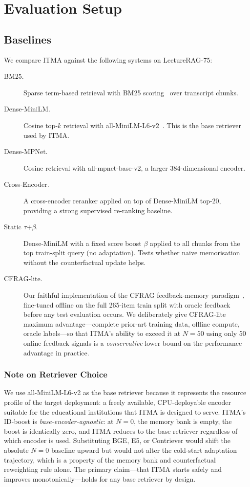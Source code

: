 \documentclass[journal]{IEEEtran}
\begin{document}
\section{Evaluation Setup}
\label{sec:eval}

\subsection{Baselines}
We compare ITMA against the following systems on LectureRAG-75:
\begin{description}
\item[BM25.] Sparse term-based retrieval with BM25
      scoring~\cite{robertson2009bm25} over transcript chunks.
\item[Dense-MiniLM.] Cosine top-$k$ retrieval with
      all-MiniLM-L6-v2~\cite{wang2020minilm}.  This is the base retriever
      used by ITMA.
\item[Dense-MPNet.] Cosine retrieval with all-mpnet-base-v2, a larger
      384-dimensional encoder.
\item[Cross-Encoder.] A cross-encoder reranker applied on top of
      Dense-MiniLM top-20, providing a strong supervised re-ranking
      baseline.
\item[Static $\tau$+$\beta$.] Dense-MiniLM with a fixed score boost
      $\beta$ applied to all chunks from the top train-split query (no
      adaptation).  Tests whether naive memorisation without the
      counterfactual update helps.
\item[CFRAG-lite.] Our faithful implementation of the CFRAG
      feedback-memory paradigm~\cite{cfrag2025}, fine-tuned offline on
      the full 265-item train split with oracle feedback before any test
      evaluation occurs.  We deliberately give CFRAG-lite maximum
      advantage---complete prior-art training data, offline compute,
      oracle labels---so that ITMA's ability to exceed it at $N{=}50$
      using only 50 online feedback signals is a \emph{conservative}
      lower bound on the performance advantage in practice.
\end{description}

\subsubsection{Note on Retriever Choice}
We use all-MiniLM-L6-v2 as the base retriever because it represents the
resource profile of the target deployment: a freely available,
CPU-deployable encoder suitable for the educational institutions that
ITMA is designed to serve.  ITMA's ID-boost is
\emph{base-encoder-agnostic}: at $N{=}0$, the memory bank is empty, the
boost is identically zero, and ITMA reduces to the base retriever
regardless of which encoder is used.  Substituting BGE, E5, or
Contriever would shift the absolute $N{=}0$ baseline upward but would
not alter the cold-start adaptation trajectory, which is a property of
the memory bank and counterfactual reweighting rule alone.  The primary
claim---that ITMA starts safely and improves monotonically---holds for
any base retriever by design.
\end{document}
